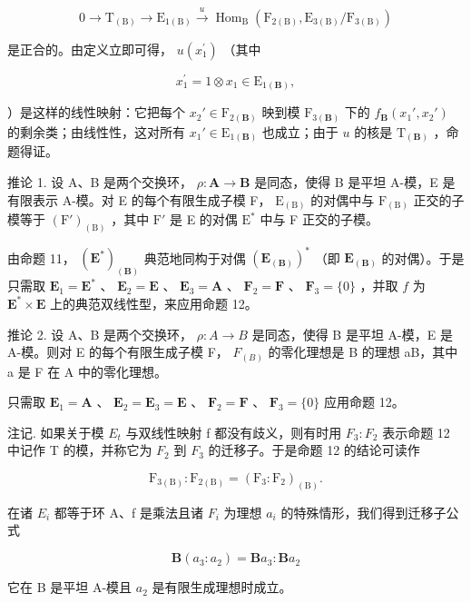 \[
0 \longrightarrow \mathrm{T} _ {(\mathrm{B})} \longrightarrow \mathrm{E} _ {1 (\mathrm{B})} \stackrel {u} {\longrightarrow} \operatorname{Hom} _ {\mathrm{B}} \left(\mathrm{F} _ {2 (\mathrm{B})}, \mathrm{E} _ {3 (\mathrm{B})} / \mathrm{F} _ {3 (\mathrm{B})}\right)
\]

是正合的。由定义立即可得， \(u(x_{1}^{\prime})\) （其中

\[
x _ {1} ^ {\prime} = 1 \otimes x _ {1} \in \mathrm{E} _ {1 (\mathbf {B})},
\]

）是这样的线性映射：它把每个 \(x_2' \in \mathrm{F}_{2(\mathbf{B})}\) 映到模 \(\mathrm{F}_{3(\mathbf{B})}\) 下的 \(f_{\mathbf{B}}(x_1', x_2')\) 的剩余类；由线性性，这对所有 \(x_1' \in \mathrm{E}_{1(\mathbf{B})}\) 也成立；由于 \(u\) 的核是 \(\mathrm{T}_{(\mathbf{B})}\) ，命题得证。

推论 1. 设 A、B 是两个交换环， \(\rho: \mathbf{A} \to \mathbf{B}\) 是同态，使得 B 是平坦 A-模，E 是有限表示 A-模。对 E 的每个有限生成子模 F， \(\mathrm{E}_{(\mathrm{B})}\) 的对偶中与 \(\mathrm{F}_{(\mathrm{B})}\) 正交的子模等于 \((\mathrm{F}')_{(\mathrm{B})}\) ，其中 \(\mathrm{F}'\) 是 E 的对偶 \(\mathrm{E}^*\) 中与 F 正交的子模。

由命题 11， \((\mathbf{E}^{*})_{(\mathbf{B})}\) 典范地同构于对偶 \((\mathbf{E}_{(\mathbf{B})})^{*}\) （即 \(\mathbf{E}_{(\mathbf{B})}\) 的对偶）。于是只需取 \(\mathbf{E}_1 = \mathbf{E}^*\) 、 \(\mathbf{E}_2 = \mathbf{E}\) 、 \(\mathbf{E}_3 = \mathbf{A}\) 、 \(\mathbf{F}_2 = \mathbf{F}\) 、 \(\mathbf{F}_3 = \{0\}\) ，并取 \(f\) 为 \(\mathbf{E}^{*} \times \mathbf{E}\) 上的典范双线性型，来应用命题 12。

推论 2. 设 A、B 是两个交换环， \(\rho: A \to B\) 是同态，使得 B 是平坦 A-模，E 是 A-模。则对 E 的每个有限生成子模 F， \(F_{(B)}\) 的零化理想是 B 的理想 aB，其中 a 是 F 在 A 中的零化理想。

只需取 \(\mathbf{E}_1 = \mathbf{A}\) 、 \(\mathbf{E}_2 = \mathbf{E}_3 = \mathbf{E}\) 、 \(\mathbf{F}_2 = \mathbf{F}\) 、 \(\mathbf{F}_3 = \{0\}\) 应用命题 12。

注记. 如果关于模 \(E_{t}\) 与双线性映射 f 都没有歧义，则有时用 \(F_{3}: F_{2}\) 表示命题 12 中记作 T 的模，并称它为 \(F_{2}\) 到 \(F_{3}\) 的迁移子。于是命题 12 的结论可读作

\[
\mathrm{F} _ {3 (\mathrm{B})}: \mathrm{F} _ {2 (\mathrm{B})} = \left(\mathrm{F} _ {3}: \mathrm{F} _ {2}\right) _ {(\mathrm{B})}.\tag{11}
\]

在诸 \(E_{i}\) 都等于环 A、f 是乘法且诸 \(F_{i}\) 为理想 \(a_{i}\) 的特殊情形，我们得到迁移子公式

\[
\mathbf {B} \left(a _ {3}: a _ {2}\right) = \mathbf {B} a _ {3}: \mathbf {B} a _ {2}\tag{12}
\]

它在 B 是平坦 A-模且 \(a_{2}\) 是有限生成理想时成立。
\relax{}
